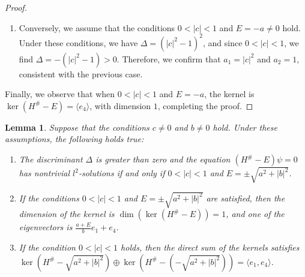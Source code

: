 \documentclass{amsart}
\newtheorem{lem}[thm]{Lemma}
\theoremstyle{definition}
\theoremstyle{remark}
\begin{document}
\begin{proof}
\begin{enumerate}
\begin{enumerate}
        \item We suppose that \(|\lambda_2| < 1\) and \(x(1) = y(1) = 0\) hold. First, we assume that \(w = 0\). Since \(|\lambda_1| |\lambda_2| = 1\), we deduce that \(a_1 \neq 0\). From \(y(1) = 0\), we find that \(z = 0\), leading to only the trivial solution \(\psi = 0\). Next, we assume that \(w \neq 0\). Since \(a_1 \neq 0\) and \(x(1) = w \frac{a^2 + |c|^2 - E^2 - a_2}{(a_1 - a_2)(a - E)} = 0\), we get \(a^2 + |c|^2 - E^2 - a_2 = 0\). Additionally, from \(a_1 + a_2 = a^2 + |c|^2 + 1 - E^2\), we obtain \(a_2 = 1\). Since \(\frac{|c|^2}{a^2 + |c|^2 - E^2} = 1\), we again find \(E = -a \neq 0\). Thus, we have \(a_1 = 1\), \(a_2 = |c|^2\), and \(0 < |c| = |\lambda_2| < 1\).
    \end{enumerate}

    \item Conversely, we assume that the conditions \(0 < |c| < 1\) and \(E = -a \neq 0\) hold. Under these conditions, we have \(\Delta = (|c|^2 - 1)^2\), and since \(0 < |c| < 1\), we find \(\Delta = -(|c|^2 - 1) > 0\). Therefore, we confirm that \(a_1 = |c|^2\) and \(a_2 = 1\), consistent with the previous case.
\end{enumerate}

Finally, we observe that when \( 0 < |c| < 1 \) and \( E = -a \), the kernel is \( \ker(H^\# - E) = \langle e_4 \rangle \), with dimension $1$, completing the proof.
\end{proof}


\begin{lem}\label{lem:6.7}
Suppose that the conditions \(c \neq 0\) and \(b \neq 0\) hold. Under these assumptions, the following holds true:
\begin{enumerate}
    \item The discriminant \(\Delta\) is greater than zero and the equation \((H^\# - E)\psi = 0\) has nontrivial \(l^2\)-solutions if and only if \(0 < |c| < 1\) and \(E = \pm \sqrt{a^2 + |b|^2}\).
    \item If the conditions \(0 < |c| < 1\) and \(E = \pm \sqrt{a^2 + |b|^2}\) are satisfied, then the dimension of the kernel is \(\dim(\ker(H^\# - E)) = 1\), and one of the eigenvectors is \(\frac{a + E}{b} e_1 + e_4\).
    \item If the condition \(0 < |c| < 1\) holds, then the direct sum of the kernels satisfies \(\ker(H^\# - \sqrt{a^2 + |b|^2}) \oplus \ker(H^\# - (-\sqrt{a^2 + |b|^2})) = \langle e_1, e_4 \rangle\).
\end{enumerate}
\end{lem}
\end{document}
